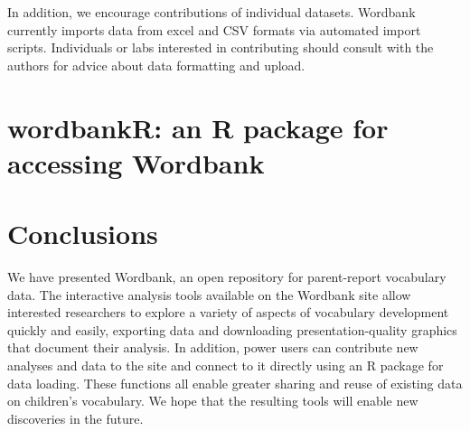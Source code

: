 \documentclass[doc,noapacite]{apa2}
\newcommand{\comment}[1]{\marginpar[]{\small \textcolor{blue}{#1}}}
\begin{document}

In addition, we encourage contributions of individual datasets. Wordbank currently imports data from excel and CSV formats via automated import scripts. Individuals or labs interested in contributing should consult with the authors for advice about data formatting and upload. \comment{MORE HERE?}


\section{wordbankR: an R package for accessing Wordbank}

\comment{TO DO: MAKE THE PACKAGE}

\section{Conclusions}

We have presented Wordbank, an open repository for parent-report vocabulary data. The interactive analysis tools available on the Wordbank site allow interested researchers to explore a variety of aspects of vocabulary development quickly and easily, exporting data and downloading presentation-quality graphics that document their analysis. In addition, power users can contribute new analyses and data to the site and connect to it directly using an R package for data loading. These functions all enable greater sharing and reuse of existing data on children's vocabulary. We hope that the resulting tools will enable new discoveries in the future.\comment{Further discussion of limitations or extensions?}



\end{document}
